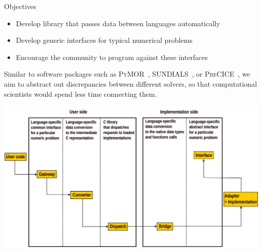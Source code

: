 \documentclass[a0paper, twocolumn, csc, english, final]{mpi2015_poster}
\begin{document}
\begin{poster}
\begin{pcolumn}
\begin{pbox}

      \begin{center}
        \begin{tcolorbox}[
          colback=white, colframe=mardiblue, parbox=true,
          left=1em, right=1em,
                    before={\par\bigskip\noindent}, after={\par\bigskip},  width=\columnwidth]
  {\Large\color{mardiblue}Objectives\medskip}
  \begin{itemize}
        \item Develop library that passes data between languages automatically
        \item Develop generic interfaces for typical numerical problems
        \item Encourage the community to program against these interfaces
  \end{itemize}
  \end{tcolorbox}
  \end{center}

      Similar to software packages such as \textsc{PyMOR}~\citep{Milk2016},
      \textsc{SUNDIALS}~\citep{GardnerEtAl2022},
      or \textsc{PreCICE}~\citep{Chourdakis2022},
      we aim to abstract out discrepancies between
      different solvers, so that computational scientists would spend less time
      connecting them.

    \end{pbox}

    \begin{pbox}
      \large
      \includegraphics[width=\columnwidth]{arch}


\end{pbox}
\end{pcolumn}
\end{poster}
\end{document}
